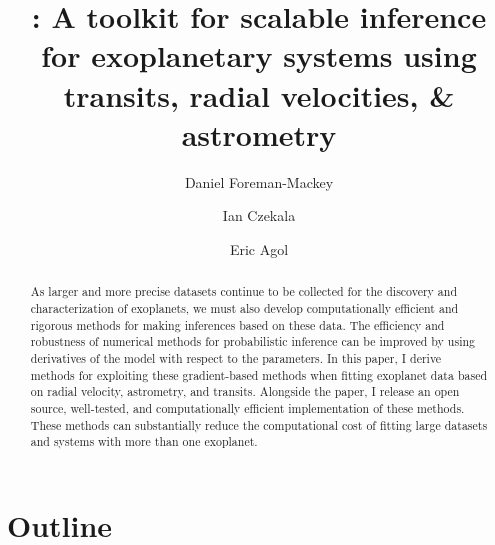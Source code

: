 \documentclass[modern]{aastex62}
\begin{document}
\raggedbottom\sloppy\sloppypar\frenchspacing

\title{%
:
A toolkit for scalable inference for exoplanetary systems using transits,
radial velocities, \& astrometry
}

\author[0000-0002-9328-5652]{Daniel Foreman-Mackey}

\author[0000-0002-1483-8811]{Ian Czekala}

\author[0000-0002-0802-9145]{Eric Agol}

\begin{abstract}

As larger and more precise datasets continue to be collected for the discovery and characterization of exoplanets, we must also develop computationally efficient and rigorous methods for making inferences based on these data.
The efficiency and robustness of numerical methods for probabilistic inference
can be improved by using derivatives of the model with respect to the
parameters.
In this paper, I derive methods for exploiting these gradient-based methods
when fitting exoplanet data based on radial velocity, astrometry, and
transits.
Alongside the paper, I release an open source, well-tested, and
computationally efficient implementation of these methods.
These methods can substantially reduce the computational cost of fitting large
datasets and systems with more than one exoplanet.

\end{abstract}


\section{Outline}
\end{document}
